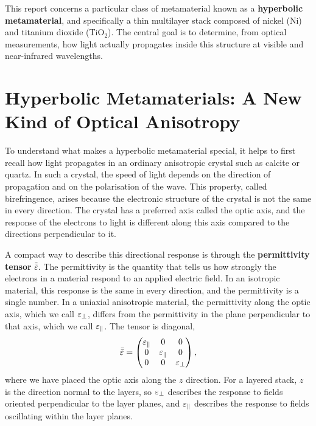 This report concerns a particular class of metamaterial known as a
\textbf{hyperbolic metamaterial}, and specifically a thin multilayer stack
composed of nickel (Ni) and titanium dioxide (TiO$_2$). The central goal is to
determine, from optical measurements, how light actually propagates inside
this structure at visible and near-infrared wavelengths.

\section{Hyperbolic Metamaterials: A New Kind of Optical Anisotropy}

To understand what makes a hyperbolic metamaterial special, it helps to first
recall how light propagates in an ordinary anisotropic crystal such as calcite
or quartz. In such a crystal, the speed of light depends on the direction of
propagation and on the polarisation of the wave. This property, called
birefringence, arises because the electronic structure of the crystal is not
the same in every direction. The crystal has a preferred axis called the optic
axis, and the response of the electrons to light is different along this axis
compared to the directions perpendicular to it.

A compact way to describe this directional response is through the
\textbf{permittivity tensor} $\bar{\bar{\varepsilon}}$. The permittivity is
the quantity that tells us how strongly the electrons in a material respond to
an applied electric field. In an isotropic material, this response is the same
in every direction, and the permittivity is a single number. In a uniaxial
anisotropic material, the permittivity along the optic axis, which we call
$\varepsilon_{\perp}$, differs from the permittivity in the plane perpendicular to that
axis, which we call $\varepsilon_{\parallel}$. The tensor is diagonal,
\begin{equation}
  \bar{\bar{\varepsilon}} = \begin{pmatrix}
    \varepsilon_{\parallel} & 0 & 0 \\ 0 & \varepsilon_{\parallel} & 0 \\ 0 & 0 & \varepsilon_{\perp}
  \end{pmatrix},
  \label{eq:ch1_tensor}
\end{equation}
where we have placed the optic axis along the $z$ direction. For a layered
stack, $z$ is the direction normal to the layers, so $\varepsilon_{\perp}$ describes the
response to fields oriented perpendicular to the layer planes, and $\varepsilon_{\parallel}$
describes the response to fields oscillating within the layer planes.

